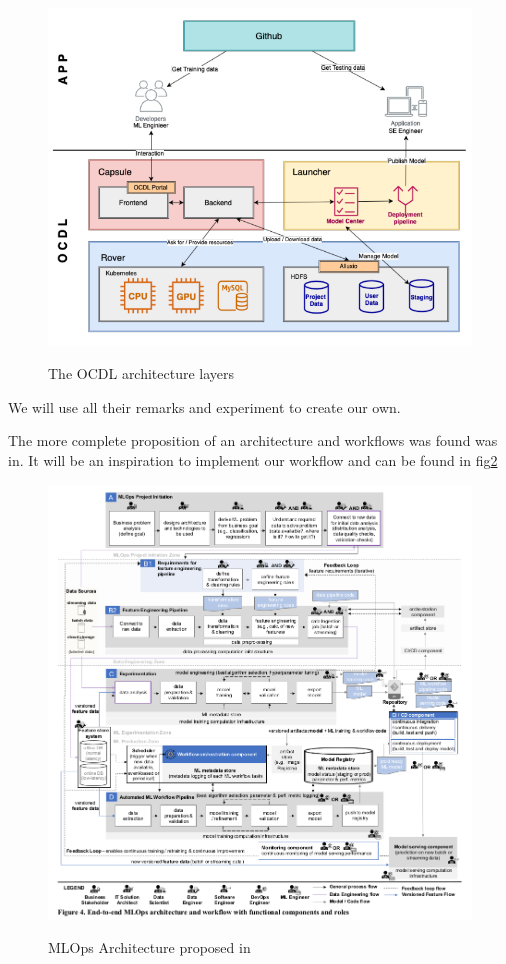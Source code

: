 \begin{figure}[!htbp]
    \caption{The OCDL architecture layers\cite{LIU2020704}}
    \centering
    \includegraphics[scale=0.5]{images/ocdl-architecture}
    \label{fig:ocdl}
\end{figure}

We will use all their remarks and experiment to create our own.

The more complete proposition of an architecture and workflows was found was in\cite{Kreuzberger2022MachineLO}.
It will be an inspiration to implement our workflow and can be found in fig\ref{fig:end-to-end-workflow}

\begin{figure}[!htbp]
    \caption{MLOps Architecture proposed in \cite{Kreuzberger2022MachineLO}}
    \centering
    \includegraphics[scale=0.5]{images/kreuz-end-to-end-workflow}
    \label{fig:end-to-end-workflow}
\end{figure}

